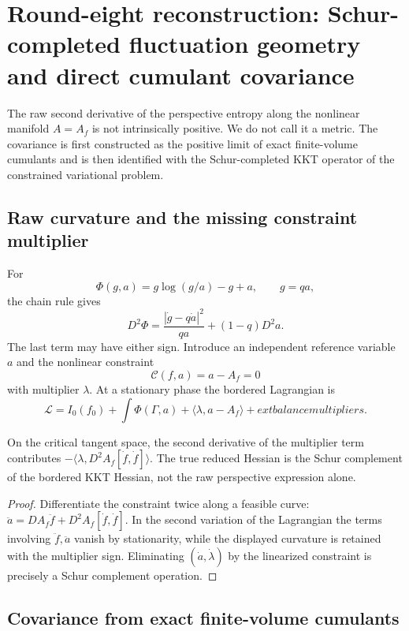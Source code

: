 \section{Round-eight reconstruction: Schur-completed fluctuation geometry and direct cumulant covariance}
\label{sec:r8-b3}

The raw second derivative of the perspective entropy along the nonlinear
manifold $A=A_f$ is not intrinsically positive.  We do not call it a metric.
The covariance is first constructed as the positive limit of exact
finite-volume cumulants and is then identified with the Schur-completed KKT
operator of the constrained variational problem.

\subsection{Raw curvature and the missing constraint multiplier}

For
\[
 \Phi(g,a)=g\log(g/a)-g+a,
 \qquad g=qa,
\]
the chain rule gives
\[
 D^2\Phi=\frac{|\dot g-q\dot a|^2}{qa}
 +(1-q)D^2a.
\]
The last term may have either sign.  Introduce an independent reference
variable $a$ and the nonlinear constraint
\[
 \mathcal C(f,a)=a-A_f=0
\]
with multiplier $\lambda$.  At a stationary phase the bordered Lagrangian is
\[
 \mathscr L=I_0(f_0)+\int\Phi(\Gamma,a)
 +\langle\lambda,a-A_f\rangle+	ext{balance multipliers}.
\]

\begin{lemma}
\label{lem:r8-b3-kkt}
On the critical tangent space, the second derivative of the multiplier term
contributes $-\langle\lambda,D^2A_f[\dot f,\dot f]\rangle$.  The true reduced
Hessian is the Schur complement of the bordered KKT Hessian, not the raw
perspective expression alone.
\end{lemma}

\begin{proof}
Differentiate the constraint twice along a feasible curve:
$\ddot a=DA_f\ddot f+D^2A_f[\dot f,\dot f]$.  In the second variation of the
Lagrangian the terms involving $\ddot f,\ddot a$ vanish by stationarity, while
the displayed curvature is retained with the multiplier sign.  Eliminating
$(\dot a,\dot\lambda)$ by the linearized constraint is precisely a Schur
complement operation.
\end{proof}

\subsection{Covariance from exact finite-volume cumulants}

